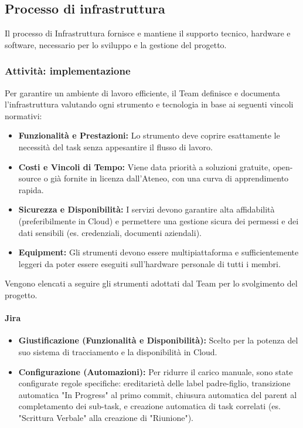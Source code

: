 \documentclass[a4paper,12pt]{article}
\begin{document}
\subsection{Processo di infrastruttura}
Il processo di Infrastruttura fornisce e mantiene il supporto tecnico, hardware e software, necessario per lo sviluppo e la gestione del progetto.

\subsubsection{Attività: implementazione}\label{ImplementazioneInfrastruttura}
Per garantire un ambiente di lavoro efficiente, il Team definisce e documenta l'infrastruttura valutando ogni strumento e tecnologia in base ai seguenti vincoli normativi:
\begin{itemize}
    \item \textbf{Funzionalità e Prestazioni:} Lo strumento deve coprire esattamente le necessità del task senza appesantire il flusso di lavoro.
    \item \textbf{Costi e Vincoli di Tempo:} Viene data priorità a soluzioni gratuite, open-source o già fornite in licenza dall'Ateneo, con una curva di apprendimento rapida.
    \item \textbf{Sicurezza e Disponibilità:} I servizi devono garantire alta affidabilità (preferibilmente in Cloud) e permettere una gestione sicura dei permessi e dei dati sensibili (es. credenziali, documenti aziendali).
    \item \textbf{Equipment:} Gli strumenti devono essere multipiattaforma e sufficientemente leggeri da poter essere eseguiti sull'hardware personale di tutti i membri.
\end{itemize}
Vengono elencati a seguire gli strumenti adottati dal Team per lo svolgimento del progetto.

\paragraph{Jira} \label{Jira}
\begin{itemize}
    \item \textbf{Giustificazione (Funzionalità e Disponibilità):} Scelto per la potenza del suo sistema di tracciamento e la disponibilità in Cloud.
    \item \textbf{Configurazione (Automazioni):} Per ridurre il carico manuale, sono state configurate regole specifiche: ereditarietà delle label padre-figlio, transizione automatica "In Progress" al primo commit, chiusura automatica del parent al completamento dei sub-task, e creazione automatica di task correlati (es. "Scrittura Verbale" alla creazione di "Riunione").
\end{itemize}
\end{document}
